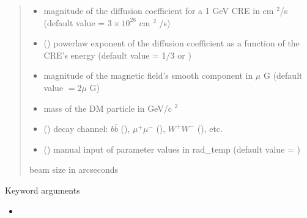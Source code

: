 \documentclass[letterpaper,10pt,english]{sphinxmanual}
\begin{document}
\begin{fulllineitems}
\begin{quote}
\begin{description}
\begin{itemize}
\item {} 
\sphinxAtStartPar
{} \textendash{} magnitude of the diffusion coefficient for a 1 GeV CRE in cm \({}^2\)/s (default value = \(3\times 10^{28}\) cm \({}^2\) /s)

\item {} 
\sphinxAtStartPar
{} (\sphinxstyleliteralemphasis{\sphinxupquote{, }}) \textendash{} power\sphinxhyphen{}law exponent of the diffusion coefficient as a function of the CRE’s energy (default value = 1/3 or )

\item {} 
\sphinxAtStartPar
{} \textendash{} magnitude of the magnetic field’s smooth component in \(\mu\) G (default value \(= 2 \mu\) G)

\item {} 
\sphinxAtStartPar
{} \textendash{} mass of the DM particle in GeV/c \({}^2\)

\item {} 
\sphinxAtStartPar
{} () \textendash{} decay channel: \(b\bar b\) (), \(\mu^+ \mu^-\) (), \(W^+ W^-\) (), etc.

\item {} 
\sphinxAtStartPar
{} () \textendash{} manual input of parameter values in rad\_temp (default value = )

\end{itemize}

\sphinxAtStartPar
beam size in arcseconds

\end{description}\end{quote}

\sphinxAtStartPar
Keyword arguments
\begin{itemize}
\item {} 
\sphinxAtStartPar
{}


\end{itemize}
\end{fulllineitems}
\end{document}

